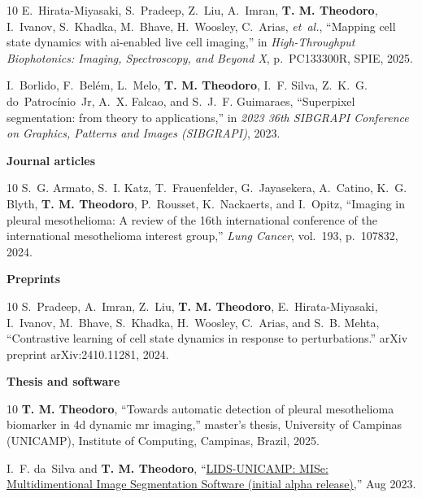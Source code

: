 \documentclass[margin,line]{resume}
\begin{document}
\begin{resume}
\begin{thebibliography}{10}
E.~Hirata-Miyasaki, S.~Pradeep, Z.~Liu, A.~Imran, {\textbf{T. M. Theodoro}},
  I.~Ivanov, S.~Khadka, M.~Bhave, H.~Woosley, C.~Arias, {\em et~al.}, ``Mapping
  cell state dynamics with ai-enabled live cell imaging,'' in {\em
  High-Throughput Biophotonics: Imaging, Spectroscopy, and Beyond X},
  p.~PC133300R, SPIE, 2025.

I.~Borlido, F.~Bel\'em, L.~Melo, {\textbf{T. M. Theodoro}}, I.~F. Silva,
  Z.~K.~G. do~Patroc\'inio~Jr, A.~X. Falcao, and S.~J.~F. Guimaraes,
  ``Superpixel segmentation: from theory to applications,'' in {\em 2023 36th
  SIBGRAPI Conference on Graphics, Patterns and Images (SIBGRAPI)}, 2023.

        \end{thebibliography}
        \vspace{0.12cm}
        \textbf{Journal articles}
        \begin{thebibliography}{10}\setcounter{enumiv}{6}
S.~G. Armato, S.~I. Katz, T.~Frauenfelder, G.~Jayasekera, A.~Catino, K.~G.
  Blyth, {\textbf{T. M. Theodoro}}, P.~Rousset, K.~Nackaerts, and I.~Opitz,
  ``Imaging in pleural mesothelioma: A review of the 16th international
  conference of the international mesothelioma interest group,'' {\em Lung
  Cancer}, vol.~193, p.~107832, 2024.

        \end{thebibliography}
        \vspace{0.12cm}
        \textbf{Preprints}
        \begin{thebibliography}{10}\setcounter{enumiv}{7}
S.~Pradeep, A.~Imran, Z.~Liu, {\textbf{T. M. Theodoro}}, E.~Hirata-Miyasaki,
  I.~Ivanov, M.~Bhave, S.~Khadka, H.~Woosley, C.~Arias, and S.~B. Mehta,
  ``Contrastive learning of cell state dynamics in response to perturbations.''
  arXiv preprint arXiv:2410.11281, 2024.

        \end{thebibliography}
        \vspace{0.12cm}
        \textbf{Thesis and software}
        \begin{thebibliography}{10}\setcounter{enumiv}{8}
{\textbf{T. M. Theodoro}}, ``Towards automatic detection of pleural
  mesothelioma biomarker in 4d dynamic mr imaging,'' master's thesis,
  University of Campinas (UNICAMP), Institute of Computing, Campinas, Brazil,
  2025.

I.~F. da~Silva and {\textbf{T. M. Theodoro}},
  ``\href{https://github.com/LIDS-UNICAMP/MISe}{LIDS-UNICAMP: MISe:
  Multidimentional Image Segmentation Software (initial alpha release)},'' Aug
  2023.

        \end{thebibliography}


     
        
     
\end{resume}   

 
\end{document}
